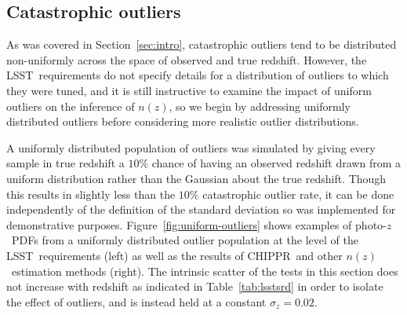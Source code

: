 \documentclass[iop]{emulateapj}
\newcommand{\Sect}[1]{Section~\ref{#1}}
\newcommand{\Fig}[1]{Figure~\ref{#1}}
\newcommand{\project}[1]{\textsc{#1}}
\newcommand{\lsst}{\project{LSST}}
\newcommand{\Chippr}{\project{CHIPPR}}%
\newcommand{\pz}{photo-$z$}
\newcommand{\pzpdf}{\pz\ PDF}%
\newcommand{\nz}{$n(z)$}
\begin{document}
\subsection{Catastrophic outliers}
\label{sec:outliers}

As was covered in \Sect{sec:intro}, catastrophic outliers tend to be distributed non-uniformly across the space of observed and true redshift.
However, the \lsst\ requirements do not specify details for a distribution of outliers to which they were tuned, and it is still instructive to examine the impact of uniform outliers on the inference of \nz, so we begin by addressing uniformly distributed outliers before considering more realistic outlier distributions.

A uniformly distributed population of outliers was simulated by giving every sample in true redshift a $10\%$ chance of having an observed redshift drawn from a uniform distribution rather than the Gaussian about the true redshift.
Though this results in slightly less than the $10\%$ catastrophic outlier rate, it can be done independently of the definition of the standard deviation so was implemented for demonstrative purposes.
\Fig{fig:uniform-outliers} shows examples of \pzpdf s from a uniformly distributed outlier population at the level of the \lsst\ requirements (left) as well as the results of \Chippr\ and other \nz\ estimation methods (right).
The intrinsic scatter of the tests in this section does not increase with redshift as indicated in Table~\ref{tab:lsstsrd}
in order to isolate the effect of outliers, and is instead held at a constant $\sigma_{z} = 0.02$.
\end{document}
